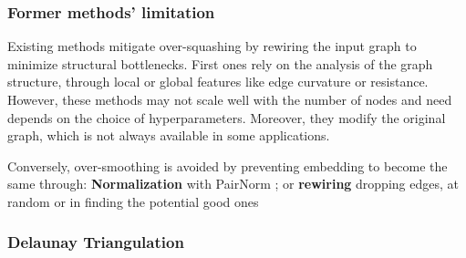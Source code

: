 \documentclass{article}
\theoremstyle{plain}
\theoremstyle{definition}
\theoremstyle{remark}
\begin{document}
\subsubsection{Former methods' limitation}
Existing methods mitigate over-squashing by rewiring
the input graph to minimize structural bottlenecks. 
First ones rely on the analysis of the graph structure, through local or global features
like edge curvature or resistance. However, these methods may not scale well with 
the number of nodes and need depends on the choice of hyperparameters. 
Moreover, they modify the original graph, which is not always available in some applications.

Conversely, over-smoothing is avoided by preventing embedding to become the same 
through: \textbf{Normalization} with PairNorm \cite{zhao2020pairnorm}; 
or \textbf{rewiring} dropping edges, at random \cite{rong2019dropedge} 
or in finding the potential good ones \cite{Giraldo_2023}

\subsubsection{Delaunay Triangulation}
\end{document}
